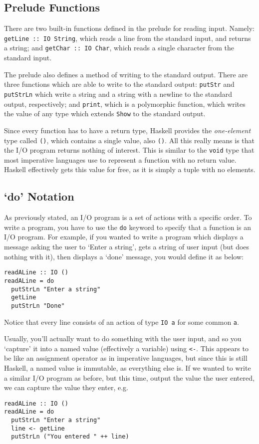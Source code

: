 \subsection*{Prelude Functions}

There are two built-in functions defined in the prelude for reading input. Namely: \verb`getLine :: IO String`, which
 reads a line from the standard input, and returns a string; and \verb`getChar :: IO Char`, which reads a single character
 from the standard input.

The prelude also defines a method of writing to the standard output. There are three functions which are able to write
 to the standard output: \verb`putStr` and \verb`putStrLn` which write a string and a string with a newline to the
 standard output, respectively; and \verb`print`, which is a polymorphic function, which writes the value of any type
 which extends \verb`Show` to the standard output.

Since every function has to have a return type, Haskell provides the \textit{one-element} type called \verb`()`, which
 contains a single value, also \verb`()`. All this really means is that the I/O program returns nothing of interest.
 This is similar to the \verb`void` type that most imperative languages use to represent a function with no return value.
 Haskell effectively gets this value for free, as it is simply a tuple with no elements.

\subsection*{`do' Notation}

As previously stated, an I/O program is a set of actions with a specific order. To write a program, you have to use the
 \verb`do` keyword to specify that a function is an I/O program. For example, if you wanted to write a program which
 displays a message asking the user to `Enter a string', gets a string of user input (but does nothing with it), then
 displays a `done' message, you would define it as below:
\begin{verbatim}
readALine :: IO ()
readALine = do
  putStrLn "Enter a string"
  getLine
  putStrLn "Done"
\end{verbatim}
Notice that every line consists of an action of type \verb`IO a` for some common \verb`a`.

Usually, you'll actually want to do something with the user input, and so you `capture' it into a named value (effectively
 a variable) using \verb`<-`. This appears to be like an assignment operator as in imperative languages, but since this
 is still Haskell, a named value is immutable, as everything else is. If we wanted to write a similar I/O program as
 before, but this time, output the value the user entered, we can capture the value they enter, e.g.
\begin{verbatim}
readALine :: IO ()
readALine = do
  putStrLn "Enter a string"
  line <- getLine
  putStrLn ("You entered " ++ line)
\end{verbatim}

